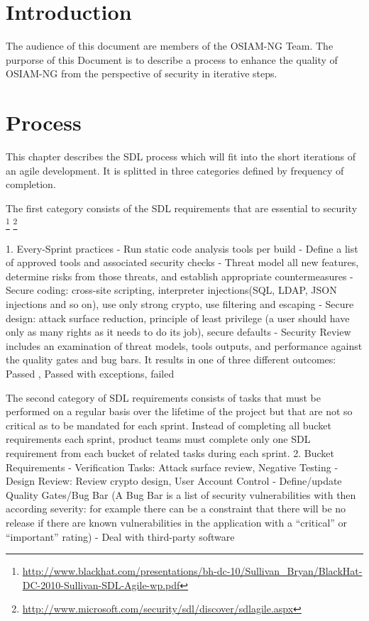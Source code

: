 \section{Introduction}

The audience of this document are members of the OSIAM-NG Team.
The purporse of this Document is to describe a process to enhance the quality of
OSIAM-NG from the perspective of security in iterative steps.

\section{Process}
This chapter describes the SDL process which will fit into the short iterations of an agile development. It is splitted in three categories defined by frequency of completion.

The first category consists of the SDL requirements that are essential to security \footnote{\url{http://www.blackhat.com/presentations/bh-dc-10/Sullivan_Bryan/BlackHat-DC-2010-Sullivan-SDL-Agile-wp.pdf}} \footnote{\url{http://www.microsoft.com/security/sdl/discover/sdlagile.aspx}}

1. Every-Sprint practices
	- Run static code analysis tools per build
	- Define a list of approved tools and associated security checks
	- Threat model all new features, determine risks from those threats, and establish appropriate countermeasures 
	- Secure coding: cross-site scripting, interpreter injections(SQL, LDAP, JSON injections and so on), use only strong crypto, use filtering and escaping
	- Secure design: attack surface reduction, principle of least privilege (a user should have only as many rights as it needs to do its job), secure defaults	
	- Security Review includes an examination of threat models, tools outputs, and performance against the quality gates and bug bars. It results in one of three different outcomes: Passed , Passed with exceptions, failed


The second category of SDL requirements consists of tasks that must be performed on a regular basis over the lifetime of the project but that are not so critical as to be mandated for each sprint.
Instead of completing all bucket requirements each sprint, product teams must complete only one SDL requirement from each bucket of related tasks during each sprint.
2. Bucket Requirements
	- Verification Tasks: Attack surface review, Negative Testing
	- Design Review: Review crypto design, User Account Control
	- Define/update Quality Gates/Bug Bar (A Bug Bar is a list of security vulnerabilities with then according severity: for example there can be a constraint that there will be no release if there are known vulnerabilities in the application with a ``critical'' or ``important'' rating)
	- Deal with third-party software

